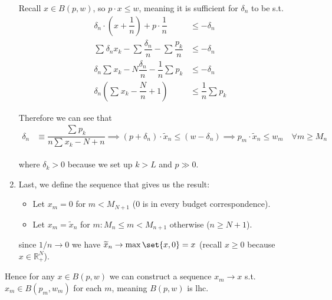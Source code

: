 \documentclass{article}
\begin{document}
\begin{enumerate}[1.]
    Recall $x \in B(p, w)$, so $p \cdot x \le w$, meaning it is sufficient for $\delta_n$ to be s.t.
    \begin{align*}
      \delta_n \cdot \left(x + \dfrac{1}{n}\right)
      +
      p \cdot \dfrac{1}{n}
      &
      \le
      - \delta_n
      \\
      \sum^{}_{} \delta_n x_k
      -
      \sum^{}_{} \dfrac{\delta_n}{n}
      -
      \sum^{}_{} \dfrac{p_k}{n}
      &
      \le
      -
      \delta_n
      \\
      \delta_n \sum^{}_{} x_k
      -
      N \dfrac{\delta_n}{n}
      -
      \dfrac{1}{n} \sum^{}_{} p_k
      &
      \le
      -
      \delta_n
      \\
      \delta_n
      \left(
        \sum^{}_{} x_k
        -
        \dfrac{N}{n}
        +
        1
      \right)
      &
      \le
      \dfrac{1}{n} \sum^{}_{} p_k
    \end{align*}

    Therefore we can see that
    \begin{align*}
      \delta_n
      &
      \equiv
      \dfrac{\sum^{}_{} p_k}{n \sum^{}_{} x_k - N + n}
      \implies
      (p + \delta_n) \cdot \widetilde{x}_n
      \le
      (w - \delta_n)
      \implies
      p_m \cdot \widetilde{x}_n
      \le
      w_m
      \quad
      \forall m \ge M_n
    \end{align*}

    where $\delta_k > 0$ because we set up $k > L$ and $p \gg 0$.

  \item Last, we define the sequence that gives us the result:
    \begin{itemize}[label=$\bullet$]
      \item Let $x_m = 0$ for $m < M_{N + 1}$ ($0$ is in every budget correspondence).

      \item Let $x_m = \widetilde{x}_n$ for $m: M_n \le m < M_{n + 1}$ otherwise ($n \ge N + 1$).
    \end{itemize}

    since $1/n \to 0$ we have $\widetilde{x}_n \to \max\set{x, 0} = x$ (recall $x \ge 0$ because $x \in \mathbb{R}^N_+$).
\end{enumerate}

Hence for any $x \in B(p, w)$ we can construct a sequence $x_m \to x$ s.t. $x_m \in B(p_m, w_m)$ for each $m$, meaning $B(p, w)$ is lhc.

\clearpage
\printindex

\end{document}
